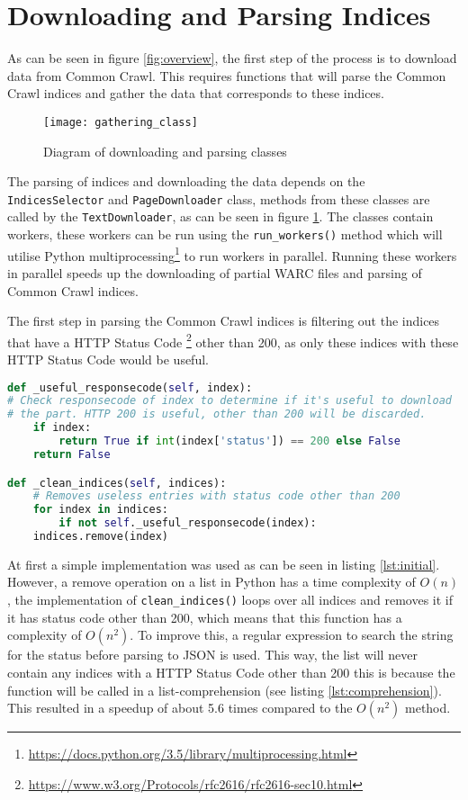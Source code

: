 \section{Downloading and Parsing Indices}

As can be seen in figure \ref{fig:overview}, the first step of the process is to download data from Common Crawl. This requires functions that will parse the Common Crawl indices and gather the data that corresponds to these indices. 

\begin{figure}[H]
\centering
\texttt{[image: gathering\_class]}
\caption{Diagram of downloading and parsing classes}
\label{fig:gathering_class}
\end{figure}

The parsing of indices and downloading the data depends on the \texttt{IndicesSelector} and \texttt{PageDownloader} class, methods from these classes are called by the \texttt{TextDownloader}, as can be seen in figure \ref{fig:gathering_class}. The classes contain workers, these workers can be run  using the \texttt{run\_workers()} method which will utilise Python multiprocessing\footnote{\url{https://docs.python.org/3.5/library/multiprocessing.html}} to run workers in parallel. Running these workers in parallel speeds up the downloading of partial WARC files and parsing of Common Crawl indices.

The first step in parsing the Common Crawl indices is filtering out the indices that have a HTTP Status Code \footnote{\url{https://www.w3.org/Protocols/rfc2616/rfc2616-sec10.html}} other than 200, as only these indices with these HTTP Status Code would be useful. 

\begin{lstlisting}[language=Python, caption=Initial implementation, label={lst:initial}]
def _useful_responsecode(self, index):
# Check responsecode of index to determine if it's useful to download
# the part. HTTP 200 is useful, other than 200 will be discarded.
    if index:
        return True if int(index['status']) == 200 else False
    return False

def _clean_indices(self, indices):
    # Removes useless entries with status code other than 200
    for index in indices:
        if not self._useful_responsecode(index):
    indices.remove(index)
\end{lstlisting}

At first a simple implementation was used as can be seen in listing \ref{lst:initial}. However, a remove operation on a list in Python has a time complexity of $O(n)$, the implementation of \texttt{clean\_indices()} loops over all indices and removes it if it has status code other than 200, which means that this function has a complexity of $O(n^2)$. To improve this, a regular expression to search the string for the status before parsing to JSON is used. This way, the list will never contain any indices with a HTTP Status Code other than 200 this is because the function will be called in a list-comprehension (see listing \ref{lst:comprehension}). This resulted in a speedup of about 5.6 times compared to the $O(n^2)$ method.


